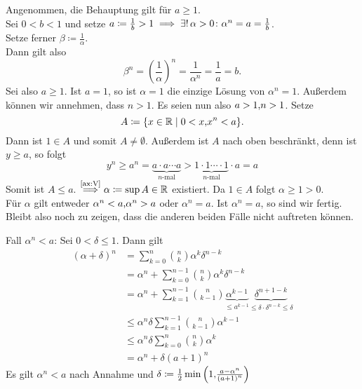 \documentclass[../ana1.tex]{subfiles}
\begin{document}
\begin{bew}
	Angenommen, die Behauptung gilt für \(a \geq 1 \). \\
	Sei \(0 < b < 1\) und setze \(a \coloneqq \frac{1}{b} > 1 \implies \exists! \, \alpha > 0 \colon \alpha^n = a = \frac{1}{b} \). \\
	Setze ferner \(\beta \coloneqq \frac{1}{\alpha}\). \\
	Dann gilt also
	\[ \beta^n = {\left(\frac{1}{\alpha}\right)}^n = \frac{1}{\alpha^n} = \frac{1}{a} = b.\]
	Sei also \(a \geq 1 \). Ist \(a = 1 \), so ist \(\alpha = 1 \) die einzige Lösung von \(\alpha^n = 1 \). Außerdem können wir annehmen, dass \(n > 1 \).
	Es seien nun also \(a > 1 \text{,} n > 1 \). Setze
	\[ A \coloneqq \{ x \in \mathbb{R} \; \vert \; 0 < x \text{,} x^n< a \}. \]
	Dann ist \(1 \in A \) und somit \(A \neq \emptyset \). Außerdem ist \(A \) nach oben beschränkt, denn ist \(y \geq a\), so folgt
	\[ y^n \geq a^n = \underbrace{a \cdot a \cdots a}_{n\text{-mal}} > \underbrace{1 \cdot 1 \cdots \cdot 1}_{n\text{-mal}} \cdot a = a \]
	Somit ist \(A \leq a \). \(\overset{\text{\autoref{ax:V}}}{\implies} \alpha \coloneqq \sup A \in \R \) existiert. Da \(1 \in A \) folgt \(\alpha \geq 1 > 0 \). \\
	Für \(\alpha \) gilt entweder \(\alpha^n <a \text{,} \alpha^n > a \) oder \(\alpha^n = a \). Ist \(\alpha^n = a \), so sind wir fertig. Bleibt also noch zu zeigen,
	dass die anderen beiden Fälle nicht auftreten können.
	\begin{faelle}
		\item[Fall \(\alpha^n < a\):] Sei \(0 < \delta \leq 1 \). Dann gilt
			\!\begin{align}
				{(\alpha + \delta)}^n & = \sum_{k=0}^{n} \binom{n}{k} \alpha^k\delta^{n-k} \nonumber \\
								  	  & = \alpha^n + \sum_{k=0}^{n-1} \binom{n}{k} \alpha^k\delta^{n-k} \nonumber \\
									  & = \alpha^n + \sum_{k=1}^{n-1} \binom{n}{k-1} \underbrace{\alpha^{k-1}}_{\leq a^{k-1}}\underbrace{\delta^{n+1-k}}_{\leq \delta \cdot \delta^{n-k} \leq \delta} \nonumber \\
									  & \leq \alpha^n \delta \sum_{k=1}^{n-1} \binom{n}{k-1} \alpha^{k-1} \nonumber \\
									  & \leq \alpha^n \delta \sum_{k=0}^{n} \binom{n}{k} \alpha^{k} \nonumber \\
									  & = \alpha^n + \delta {(a+1)}^n \tag{*}
			\end{align}
			Es gilt \(\alpha^n < a\) nach Annahme und \(\delta \coloneqq \frac{1}{2} \min{\left(1 \text{,}\frac{a-\alpha^n}{{(a+1)}^n}\right)} \) \\

\end{faelle}
\end{bew}
\end{document}
